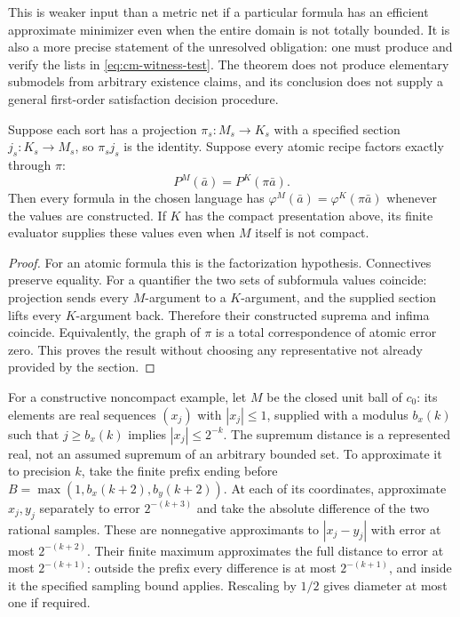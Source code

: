 This is weaker input than a metric net if a particular formula has an
efficient approximate minimizer even when the entire domain is not
totally bounded. It is also a more precise statement of the unresolved
obligation: one must produce and verify the lists in
\eqref{eq:cm-witness-test}. The theorem does not produce elementary
submodels from arbitrary existence claims, and its conclusion does
not supply a general first-order satisfaction decision procedure.

\begin{proposition}
\label{prop:cm-observable-quotient}
Suppose each sort has a projection $\pi_s:M_s\to K_s$ with a
specified section $j_s:K_s\to M_s$, so $\pi_sj_s$ is the identity.
Suppose every atomic recipe factors exactly through $\pi$:
\[
 P^M(\bar a)=P^K(\pi\bar a).
\]
Then every formula in the chosen language has
$\varphi^M(\bar a)=\varphi^K(\pi\bar a)$ whenever the values are
constructed. If $K$ has the compact presentation above, its finite
evaluator supplies these values even when $M$ itself is not compact.
\end{proposition}
\begin{proof}
For an atomic formula this is the factorization hypothesis.
Connectives preserve equality. For a quantifier the two sets of
subformula values coincide: projection sends every $M$-argument to a
$K$-argument, and the supplied section lifts every $K$-argument back.
Therefore their constructed suprema and infima coincide. Equivalently,
the graph of $\pi$ is a total correspondence of atomic error zero.
This proves the result without choosing any representative not already
provided by the section.
\end{proof}

For a constructive noncompact example, let $M$ be the closed unit ball
of $c_0$: its elements are real sequences $(x_j)$ with $|x_j|\leq1$,
supplied with a modulus $b_x(k)$ such that
$j\geq b_x(k)$ implies $|x_j|\leq2^{-k}$.
The supremum distance is a represented real, not an assumed supremum
of an arbitrary bounded set. To approximate it to precision $k$,
take the finite prefix ending before
$B=\max(1,b_x(k+2),b_y(k+2))$. At each of its coordinates,
approximate $x_j,y_j$ separately to error $2^{-(k+3)}$ and take
the absolute difference of the two rational samples. These are
nonnegative approximants to $|x_j-y_j|$ with error at most
$2^{-(k+2)}$. Their finite maximum
approximates the full distance to error at most $2^{-(k+1)}$:
outside the prefix every difference is at most $2^{-(k+1)}$,
and inside it the specified sampling bound applies. Rescaling by
$1/2$ gives diameter at most one if required.


